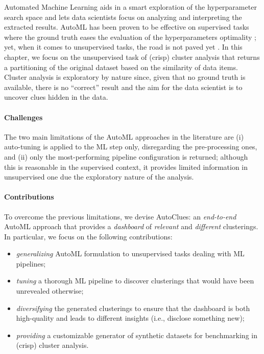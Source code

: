 Automated Machine Learning aids in a smart exploration of the hyperparameter search space \cite{hutter2011sequential} and lets data scientists focus on analyzing and interpreting the extracted results.
AutoML has been proven to be effective on supervised tasks where the ground truth eases the evaluation of the hyperparameters optimality   \cite{thornton2013auto,FRANCIA2023182}; yet, when it comes to unsupervised tasks, the road is not paved yet \cite{barlow1989unsupervised}.
In this chapter, we focus on the unsupervised task of (crisp) cluster analysis \cite{arthur2006k} that returns a partitioning of the original dataset based on the similarity of data items.
Cluster analysis is exploratory by nature since, given that no ground truth is available, there is no ``correct'' result \cite{no_correct_clustering,lensen2017using} and the aim for the data scientist is to uncover clues hidden in the data.
\paragraph{Challenges} The two main limitations of the AutoML approaches in the literature are (i) auto-tuning is applied to the ML step only, disregarding the pre-processing ones, and (ii) only the most-performing pipeline configuration is returned; although this is reasonable in the supervised context, it provides limited information in unsupervised one due the exploratory nature of the analysis.

\paragraph{Contributions} To overcome the previous limitations, we devise AutoClues: an \textit{end-to-end} AutoML approach that provides a \textit{dashboard} of \textit{relevant} and \textit{different} clusterings. In particular, we focus on the following contributions:
\begin{itemize}
    \item \textit{generalizing} AutoML formulation to unsupervised tasks dealing with ML pipelines;
    \item \textit{tuning} a thorough ML pipeline to discover clusterings that would have been unrevealed otherwise;
    \item \textit{diversifying} the generated clusterings to ensure that the dashboard is both high-quality and leads to different insights (i.e., disclose something new);
    \item \textit{providing} a customizable generator of synthetic datasets for benchmarking in (crisp) cluster analysis.
\end{itemize}

